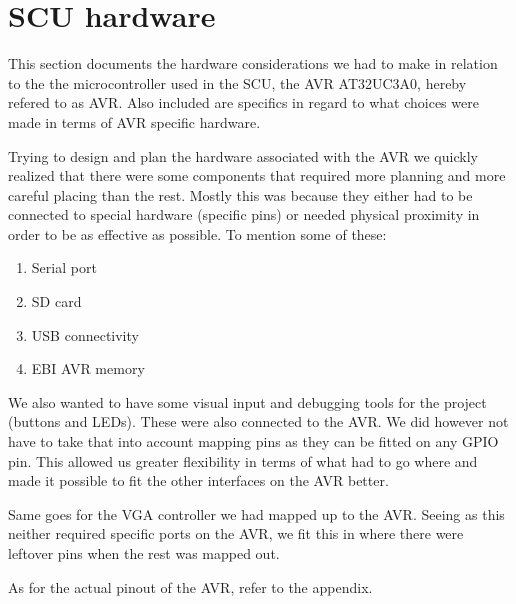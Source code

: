 \section{SCU hardware}

This section documents the hardware considerations we had to make in relation to
the the microcontroller used in the SCU, the AVR AT32UC3A0, hereby refered to as AVR. 
Also included are specifics in regard to what choices
were made in terms of AVR specific hardware. 

Trying to design and plan the hardware associated with the AVR we quickly realized that there were some components that required more planning and more careful placing than the rest. Mostly this was because they either had to be connected to special hardware (specific pins) or needed physical proximity in order to be as effective as possible. To mention some of these:

\begin{enumerate}
\item Serial port
\item \ac{SD} card
\item \ac{USB} connectivity
\item \ac{EBI} AVR memory
\end{enumerate}

We also wanted to have some visual input and debugging tools for the project
(buttons and LEDs). These were also connected to the AVR. We did however not
have to take that into account mapping pins as they can be fitted on any
\ac{GPIO} pin. This allowed us greater flexibility in terms of what had to go
where and made it possible to fit the other interfaces on the AVR better.

Same goes for the \ac{VGA} controller we had mapped up to the AVR. Seeing
as this neither required specific ports on the AVR, we fit this in where
there were leftover pins when the rest was mapped out.

As for the actual pinout of the AVR, refer to the appendix.

